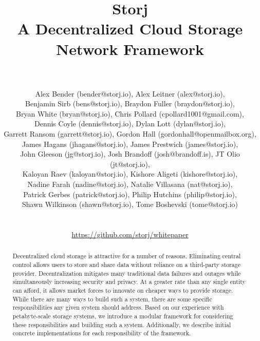 \documentclass[a4paper,10pt]{article} \usepackage[utf8]{inputenc}
\title{\textbf{Storj\\A Decentralized Cloud Storage Network Framework}}
\author{\\ \parbox{\linewidth}{\centering\small Alex Bender (bender@storj.io),
Alex Leitner (alex@storj.io),\\ Benjamin Sirb (bens@storj.io), Braydon Fuller
(braydon@storj.io),\\ Bryan White (bryan@storj.io), Chris Pollard
(cpollard1001@gmail.com),\\ Dennis Coyle (dennis@storj.io), Dylan Lott
(dylan@storj.io),\\ Garrett Ransom (garrett@storj.io), Gordon Hall
(gordonhall@openmailbox.org),\\ James Hagans (jhagans@storj.io), James Prestwich
(james@storj.io),\\ John Gleeson (jg@storj.io), Josh Brandoff
(josh@brandoff.is), JT Olio (jt@storj.io),\\ Kaloyan Raev (kaloyan@storj.io),
Kishore Aligeti (kishore@storj.io),\\ Nadine Farah (nadine@storj.io), Natalie
Villasana (nat@storj.io),\\ Patrick Gerbes (patrick@storj.io), Philip Hutchins
(philip@storj.io),\\ Shawn Wilkinson (shawn@storj.io), Tome Boshevski
(tome@storj.io)}\\ \\ \small \url{https://github.com/storj/whitepaper} } \date
\begin{document}
 \maketitle

\begin{abstract} Decentralized cloud storage is attractive for a number of
reasons. Eliminating central control allows users to store and share data
without reliance on a third-party storage provider. Decentralization mitigates
many traditional data failures and outages while simultaneously increasing
security and privacy. At a greater rate than any single entity can afford, it allows
market forces to innovate on cheaper ways to provide storage. While there
are many ways to build such a system, there are some specific responsibilities
any given system should address. Based on our experience with petabyte-scale
storage systems, we introduce a modular framework for considering these
responsibilities and building such a system. Additionally, we describe initial concrete
implementations for each responsibility of the framework. \end{abstract}
\end{document}
